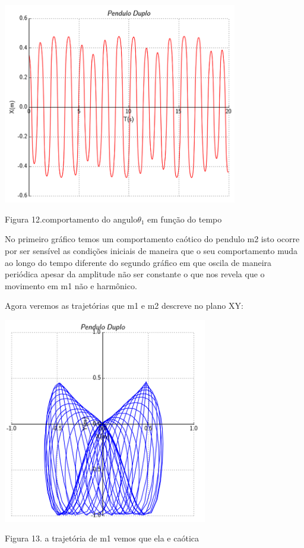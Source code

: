 \documentclass[a4paper]{article} %
\begin{document}
\begin{center}
	\includegraphics[width=4.03in,height=3.46in, keepaspectratio=false]{pendulo_duploTX2.png}
	
	\scriptsize {Figura 12.comportamento do angulo$\theta_1$ em fun\c{c}\~{a}o do tempo}
\end{center}

No primeiro gráfico temos um comportamento caótico do pendulo m2 isto ocorre por ser sensível as condições iniciais de maneira que o seu comportamento muda ao longo do tempo diferente do segundo gráfico em que oscila de maneira periódica apesar da amplitude não ser constante o que nos revela que o movimento em m1 não e harmônico. 

Agora veremos as trajetórias que m1 e m2 descreve no plano XY: 
  

\begin{center}
	\includegraphics[width=3.51in,height=3.53in, keepaspectratio=false]{pendulo_duploXY.png}
	
	\scriptsize {Figura 13. a trajetória de m1 vemos que ela e caótica}
\end{center}
\end{document}
